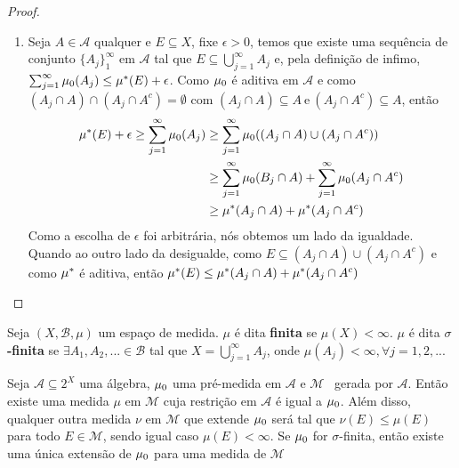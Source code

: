 \begin{proposicao}
\begin{proof}
\begin{enumerate}[label=(\roman*)]
            \item Seja $A \in \mathcal{A}$ qualquer e $E \subseteq X$, fixe $\epsilon>0$, temos que existe uma sequência de conjunto $\{A_j\}_{1}^\infty$ em $\mathcal{A}$ tal que $E \subseteq \bigcup _{j=1}^\infty A_j$ e, pela definição de infimo, $\sum _{j=1}^\infty \mu_0(A_j) \leq \mu^*(E) + \epsilon$. Como $\mu_0$ é aditiva em $\mathcal{A}$ e como $(A_j \cap A) \cap (A_j \cap A^c) = \emptyset$ com $(A_j \cap A) \subseteq A \ \text{e} \ (A_j \cap A^c) \subseteq A$, então
            \begin{align*}
                \mu^*(E)+\epsilon \geq  \sum _{j=1}^\infty \mu_0(A_j) &\geq \sum _{j=1}^\infty \mu_0((A_j \cap A) \cup (A_j \cap A^c)) \\ &\geq \sum _{j=1}^\infty \mu_0(B_j \cap A) + \sum _{j=1}^\infty \mu_0(A_j \cap A^c) \\ &\geq \mu^*(A_j \cap A) + \mu^* (A_j \cap A^c)
            \end{align*}
            Como a escolha de $\epsilon$ foi arbitrária, nós obtemos um lado da igualdade.
            Quando ao outro lado da desigualde, como $E \subseteq (A_j \cap A) \cup (A_j \cap A^c)$ e como $\mu^*$ é aditiva, então $\mu^*(E) \leq \mu^*(A_j \cap A) + \mu^* (A_j \cap A^c)$

        \end{enumerate}
    \end{proof}
\end{proposicao}

\begin{definicao}
    Seja $(X, \mathcal{B},\mu)$ um espaço de medida. $\mu$ é dita \textbf{finita} se $\mu(X)<\infty$. $\mu$ é dita \textbf{$\sigma$-finita} se $\exists A_1, A_2, ... \in \mathcal{B}$ tal que $X=\bigcup _{j=1} ^\infty A_j$, onde $\mu(A_j)<\infty, \forall j = 1,2,...$ 
\end{definicao}

\begin{teorema} \label{teo2.4}
    Seja $\mathcal{A} \subseteq 2^X$ uma álgebra, $\mu_0$  uma pré-medida em $\mathcal{A}$ e $\mathcal{M}$ \sig \ gerada por $\mathcal{A}$. Então existe uma medida $\mu$ em $\mathcal{M}$ cuja restrição em $\mathcal{A}$ é igual a $\mu_0$. Além disso, qualquer outra medida $\nu$ em $\mathcal{M}$ que extende $\mu_0$  será tal que $\nu(E) \leq \mu(E)$ para todo $E \in \mathcal{M}$, sendo igual caso $\mu(E)<\infty$. Se $\mu_0$  for $\sigma$-finita, então existe uma única extensão de $\mu_0$  para uma medida de $\mathcal{M}$
\end{teorema}

